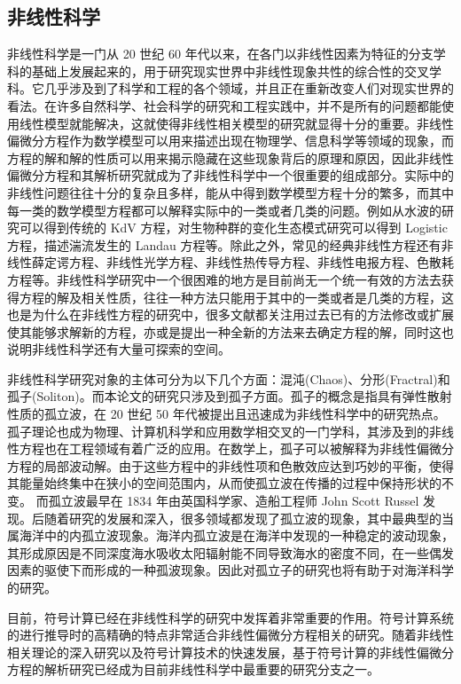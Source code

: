 \subsection{非线性科学}
非线性科学是一门从 20 世纪 60 年代以来，在各门以非线性因素为特征的分支学科的基础上发展起来的，用于研究现实世界中非线性现象共性的综合性的交叉学科。它几乎涉及到了科学和工程的各个领域，并且正在重新改变人们对现实世界的看法。在许多自然科学、社会科学的研究和工程实践中，并不是所有的问题都能使用线性模型就能解决，这就使得非线性相关模型的研究就显得十分的重要。非线性偏微分方程作为数学模型可以用来描述出现在物理学、信息科学等领域的现象，而方程的解和解的性质可以用来揭示隐藏在这些现象背后的原理和原因，因此非线性偏微分方程和其解析研究就成为了非线性科学中一个很重要的组成部分。实际中的非线性问题往往十分的复杂且多样，能从中得到数学模型方程十分的繁多，而其中每一类的数学模型方程都可以解释实际中的一类或者几类的问题。例如从水波的研究可以得到传统的 KdV 方程，对生物种群的变化生态模式研究可以得到 Logistic 方程，描述湍流发生的 Landau 方程等。除此之外，常见的经典非线性方程还有非线性薛定谔方程、非线性光学方程、非线性热传导方程、非线性电报方程、色散耗方程等。非线性科学研究中一个很困难的地方是目前尚无一个统一有效的方法去获得方程的解及相关性质，往往一种方法只能用于其中的一类或者是几类的方程，这也是为什么在非线性方程的研究中，很多文献都关注用过去已有的方法修改或扩展使其能够求解新的方程，亦或是提出一种全新的方法来去确定方程的解，同时这也说明非线性科学还有大量可探索的空间。

非线性科学研究对象的主体可分为以下几个方面：混沌(Chaos)、分形(Fractral)和孤子(Soliton)。而本论文的研究只涉及到孤子方面。孤子的概念是指具有弹性散射性质的孤立波，在 20 世纪 50 年代被提出且迅速成为非线性科学中的研究热点。孤子理论也成为物理、计算机科学和应用数学相交叉的一门学科，其涉及到的非线性方程也在工程领域有着广泛的应用。在数学上，孤子可以被解释为非线性偏微分方程的局部波动解。由于这些方程中的非线性项和色散效应达到巧妙的平衡，使得其能量始终集中在狭小的空间范围内，从而使孤立波在传播的过程中保持形状的不变。 而孤立波最早在 1834 年由英国科学家、造船工程师 John Scott Russel 发现。后随着研究的发展和深入，很多领域都发现了孤立波的现象，其中最典型的当属海洋中的内孤立波现象。海洋内孤立波是在海洋中发现的一种稳定的波动现象，其形成原因是不同深度海水吸收太阳辐射能不同导致海水的密度不同，在一些偶发因素的驱使下而形成的一种孤波现象。因此对孤立子的研究也将有助于对海洋科学的研究。

目前，符号计算已经在非线性科学的研究中发挥着非常重要的作用。符号计算系统的进行推导时的高精确的特点非常适合非线性偏微分方程相关的研究。随着非线性相关理论的深入研究以及符号计算技术的快速发展，基于符号计算的非线性偏微分方程的解析研究已经成为目前非线性科学中最重要的研究分支之一。



